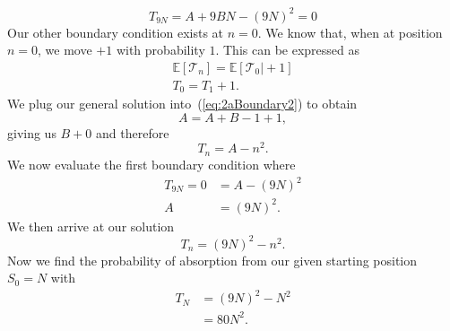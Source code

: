 \documentclass{article}
\newcommand{\E}{\mathbb{E}}
\begin{document}
\begin{equation}
    T_{9N} = A + 9BN-(9N)^2=0
\end{equation}
Our other boundary condition exists at $n=0$. We know that, when at position $n=0$, we move $+1$ with probability $1$. This can be expressed as
\begin{align}
    \E[\mathcal{T}_n]=\E[\mathcal{T}_0\vert+1] \\
    T_0 = T_1 + 1. \label{eq:2aBoundary2}
\end{align}
We plug our general solution into~(\ref{eq:2aBoundary2}) to obtain
\begin{equation}
    A=A+B-1+1,
\end{equation}
giving us $B+0$ and therefore 
\begin{equation}
    T_n = A-n^2.
\end{equation}
We now evaluate the first boundary condition where
\begin{align}
    T_{9N} = 0 &= A - (9N)^2\\
    A &= (9N)^2.
\end{align}
We then arrive at our solution
\begin{equation}
    T_n = (9N)^2-n^2.
\end{equation}
Now we find the probability of absorption from our given starting position $S_0 = N$ with
\begin{align}
    T_N &= (9N)^2 - N^2 \\
    &= 80N^2.
\end{align}
\end{document}
